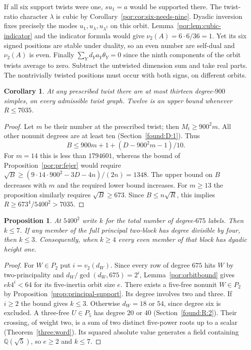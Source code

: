 \documentclass[11pt,a4paper]{article}
\numberwithin{equation}{section}
\newtheorem{proposition}[theorem]{Proposition}
\newtheorem{corollary}[theorem]{Corollary}
\theoremstyle{remark}
\newcommand{\QQ}{\mathbb Q}
\begin{document}
If all six support twists were one, $su_1=a$ would be supported there. The twist-ratio character $\lambda$ is cubic by Corollary~\ref{por:cor:six-needs-nine}. Dyadic inversion fixes precisely the modes $u_1,u_\lambda,u_{\lambda^2}$ on this orbit. Lemma~\ref{por:lem:cubic-indicator} and the indicator formula would give $\nu_2(A)=6\cdot6/36=1$. Yet its six signed positions are stable under duality, so an even number are self-dual and $\nu_2(A)$ is even. Finally $\sum_Y d_Ya_Y\theta_Y=0$ since the ninth components of the orbit twists average to zero. Subtract the untwisted dimension sum and take real parts. The nontrivially twisted positions must occur with both signs, on different orbits.




\begin{corollary}\label{por:cor:thirteen}
At any prescribed twist there are at most thirteen degree-$900$ simples, on every admissible twist graph. Twelve is an upper bound whenever $R\le7035$.
\end{corollary}
\begin{proof}
Let $m$ be their number at the prescribed twist; then $M_t\ge 900^2m$. All other nonunit degrees are at least ten (Section~\ref{found:D:1}). Thus
\[
 B\le 900m+1+(D-900^2m-1)/10 .
\]
For $m=14$ this is less than $1794601$, whereas the bound of Proposition~\ref{por:pr:fejer} would require $\sqrt B\ge (9\cdot14\cdot900^2-3D-4n)/(2n)=1348$. The upper bound on $B$ decreases with $m$ and the required lower bound increases. For $m\ge13$ the proposition similarly requires $\sqrt B\ge673$. Since $B\le n\sqrt R$, this implies $R\ge 673^4/5400^2>7035$.
\end{proof}


\begin{proposition}\label{por:prop:cap675}
At $5400^2$ write $k$ for the total number of degree-$675$ labels. Then $k\le7$. If any member of the full principal two-block has degree divisible by four, then $k\le3$. Consequently, when $k\ge4$ every even member of that block has dyadic height one.
\end{proposition}
\begin{proof}
For $W\in P_2$ put $i=v_2(d_W)$. Since every row of degree $675$ hits $W$ by two-principality and $d_W/\gcd(d_W,675)=2^i$, Lemma~\ref{por:orbitbound} gives $ek4^i<64$ for its five-inertia orbit size $e$. There exists a five-free nonunit $W\in P_2$ by Proposition~\ref{prop:principal-support}. Its degree involves two and three. If $i\ge2$ the bound gives $k\le3$. Otherwise $d_W=18$ or $54$, since degree six is excluded. A three-free $U\in P_5$ has degree $20$ or $40$ (Section~\ref{found:R:2}). Their crossing, of weight two, is a sum of two distinct five-power roots up to a scalar (Theorem~\ref{three:word}). Its squared absolute value generates a field containing $\QQ(\sqrt5)$, so $e\ge2$ and $k\le7$.
\end{proof}
\end{document}
